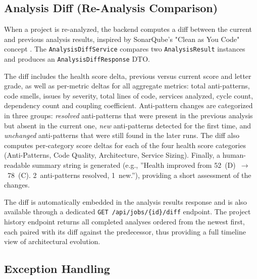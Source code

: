 \subsection{Analysis Diff (Re-Analysis Comparison)}
\label{subsec:analysis-diff}

 \par When a project is re-analyzed, the backend computes a diff between the current and previous analysis results, inspired by SonarQube's "Clean as You Code" concept \cite{SonQ}. The \texttt{AnalysisDiffService} compares two \texttt{AnalysisResult} instances and produces an \texttt{AnalysisDiffResponse} DTO.

The diff includes the health score delta, previous versus current score and letter grade, as well as per-metric deltas for all aggregate metrics: total anti-patterns, code smells, issues by severity, total lines of code, services analyzed, cycle count, dependency count and coupling coefficient. Anti-pattern changes are categorized in three groups: \textit{resolved} anti-patterns that were present in the previous analysis but absent in the current one, \textit{new} anti-patterns detected for the first time, and \textit{unchanged} anti-patterns that were still found in the later runs. The diff also computes per-category score deltas for each of the four health score categories (Anti-Patterns, Code Quality, Architecture, Service Sizing). Finally, a human-readable summary string is generated (e.g., ''Health improved from 52~(D)~$\to$~78~(C). 2~anti-patterns resolved, 1~new.''), providing a short assessment of the changes.

The diff is automatically embedded in the analysis results response and is also available through a dedicated \texttt{GET /api/jobs/\{id\}/diff} endpoint. The project history endpoint returns all completed analyses ordered from the newest first, each paired with its diff against the predecessor, thus providing a full timeline view of architectural evolution.

\subsection{Exception Handling}
\label{subsec:exception-handling}

